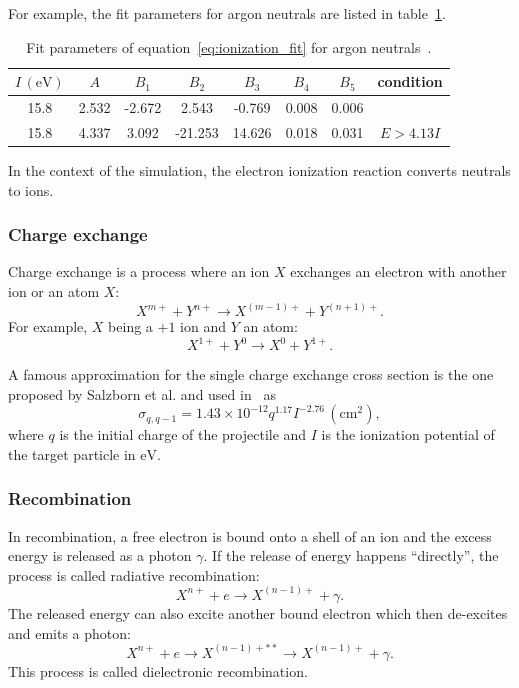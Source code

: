 \documentclass[a4paper,twoside,12pt]{article}
\begin{document}
For example, the fit parameters for argon neutrals are listed in table~\ref{table:argon_ionization}.
\begin{table}
    \centering
    \caption{Fit parameters of equation~\ref{eq:ionization_fit} for argon neutrals~\cite{recommended_ionization}.}
    \label{table:argon_ionization}
    \begin{tabular}{cccccccc}
        \toprule
        $I\,(\si{\electronvolt})$ & $A$ & $B_1$ & $B_2$ & $B_3$ & $B_4$ & $B_5$ & condition\\
        \midrule
        15.8 & 2.532 & -2.672 & 2.543 & -0.769 & 0.008 & 0.006 & \\
        15.8 & 4.337 & 3.092 & -21.253 & 14.626 & 0.018 & 0.031 & $E > 4.13I$ \\
        \bottomrule
    \end{tabular}
\end{table}

In the context of the simulation, the electron ionization reaction converts neutrals to ions.

\subsubsection{Charge exchange}
Charge exchange is a process where an ion $X$ exchanges an electron with another ion or an atom $X$:
\[
    X^{m+} + Y^{n+} \rightarrow X^{(m-1)+} + Y^{(n+1)+}.
\]
For example, $X$ being a $+1$ ion and $Y$ an atom:
\[
    X^{1+} + Y^0 \rightarrow X^{0} + Y^{1+}.
\]

A famous approximation for the single charge exchange cross section is the one proposed by Salzborn et al. and used in~\cite{cex} as
\begin{equation}
    \label{eq:cex}
    \sigma_{q, q-1} = 1.43 \times 10^{-12} q^{1.17} I^{-2.76}\,(\si{\centi\metre\squared}),
\end{equation}
where $q$ is the initial charge of the projectile and $I$ is the ionization potential of the target particle in $\si{\electronvolt}$.

\subsubsection{Recombination}
In recombination, a free electron is bound onto a shell of an ion and the excess energy is released as a photon $\gamma$. If the release of energy happens ``directly'', the process is called radiative recombination:
\[
    X^{n+} + e \rightarrow X^{(n-1)+} + \gamma.
\]
The released energy can also excite another bound electron which then de-excites and emits a photon:
\[
    X^{n+} + e \rightarrow X^{(n-1)+**} \rightarrow X^{(n-1)+} + \gamma.
\]
This process is called dielectronic recombination.~\cite{nist:recombination}
\end{document}
